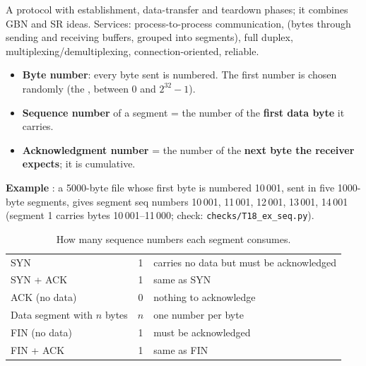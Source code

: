 \begin{definitionbox}[TCP]
A  protocol with establishment, data-transfer and teardown phases; it combines GBN and SR ideas. Services: process-to-process communication,  (bytes through sending and receiving buffers, grouped into segments), full duplex, multiplexing/demultiplexing, connection-oriented, reliable. 
\end{definitionbox}

\begin{definitionbox}
\begin{itemize}
  \item \textbf{Byte number}: every byte sent is numbered. The first number is chosen randomly (the , between 0 and $2^{32}-1$).
  \item \textbf{Sequence number} of a segment = the number of the \textbf{first data byte} it carries.
  \item \textbf{Acknowledgment number} = the number of the \textbf{next byte the receiver expects}; it is cumulative.
\end{itemize}
\end{definitionbox}

\textbf{Example} : a 5000-byte file whose first byte is numbered 10\,001, sent in five 1000-byte segments, gives segment seq numbers 10\,001, 11\,001, 12\,001, 13\,001, 14\,001 (segment 1 carries bytes 10\,001--11\,000; check: \texttt{checks/T18\_ex\_seq.py}).

\begin{table}[H]\centering\footnotesize\zebra
\begin{tabularx}{\linewidth}{L{40mm}cY}\toprule
{} &  & \\\midrule
SYN & 1 & carries no data but must be acknowledged \\
SYN + ACK & 1 & same as SYN \\
ACK (no data) & 0 & nothing to acknowledge \\
Data segment with $n$ bytes & $n$ & one number per byte\\
FIN (no data) & 1 & must be acknowledged\\
FIN + ACK & 1 & same as FIN\\\bottomrule
\end{tabularx}
\caption{How many sequence numbers each segment consumes. }
\end{table}

